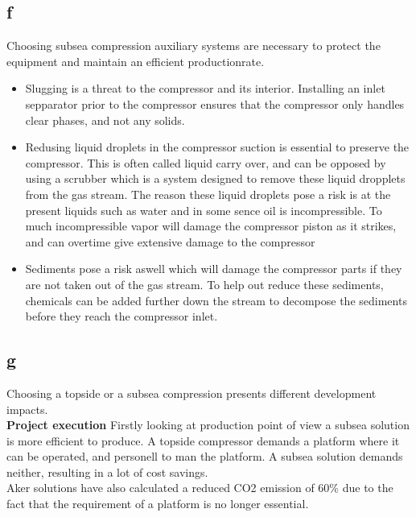 \documentclass[a4paper,norsk]{article}
\begin{document}
\subsection*{f}
Choosing subsea compression auxiliary systems are necessary to protect the equipment and maintain an efficient productionrate.
\begin{itemize}
\item Slugging is a threat to the compressor and its interior. Installing an inlet sepparator prior to the compressor ensures that the compressor only handles clear phases, and not any solids.
\item Redusing liquid droplets in the compressor suction is essential to preserve the compressor. This is often called liquid carry over, and can be opposed by using a scrubber which is a system designed to remove these liquid dropplets from the gas stream.
The reason these liquid droplets pose a risk is at the present liquids such as water and in some sence oil is incompressible. To much incompressible vapor will damage the compressor piston as it strikes, and can overtime give extensive damage to the compressor
\item Sediments pose a risk aswell which will damage the compressor parts if they are not taken out of the gas stream. To help out reduce these sediments, chemicals can be added further down the stream to decompose the sediments before they reach the compressor inlet.
\end{itemize}

\subsection{g}
Choosing a topside or a subsea compression presents different development impacts. \\
\textbf{Project execution}
Firstly looking at production point of view a subsea solution is more efficient to produce. A topside compressor demands a platform where it can be operated, and personell to man the platform. A subsea solution demands neither, resulting in a lot of cost savings. \\
Aker solutions have also calculated a reduced CO2 emission of 60\% due to the fact that the requirement of a platform is no longer essential. 
\end{document}
